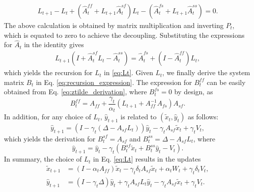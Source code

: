 \begin{align*}
    L_{t+1} - L_t
    + (\hat{A}_t^{ff} + L_{t+1} \hat{A}_t^{sf}) L_t - (\hat{A}_t^{fs} + L_{t+1} \hat{A}_t^{ss}) = 0 
    .
\end{align*}
The above calculation is obtained by matrix multiplication and inverting $P_t$, which is equated to zero to achieve the decoupling. 
Substituting the expressions for $\hat{A}_t$ in the identity gives
\begin{align*}
    L_{t+1} (I + \hat{A}_t^{sf} L_t - \hat{A}_t^{ss}) = \hat{A}_t^{fs} + (I - \hat{A}_t^{ff}) L_t,
\end{align*}
which yields the recursion for $L_t$ in \eqref{eq:Lt}. Given $L_{t}$, we finally derive the system matrix $B_t$ in Eq. \eqref{eq:recursion_expression}.
The expression for $B_t^{ff}$ can be easily obtained from Eq. \eqref{eq:ztilde_derivation}, where $B_t^{fs} = 0 $ by design, as
\begin{equation*}
    B_t^{ff} = A_{ff} + \frac{\gamma_t}{\alpha_t} (L_{t+1} + A_{ff}^{-1} A_{fs}) A_{sf} .
\end{equation*}
In addition, for any choice of $L_t$, $\hat{y}_{t+1}$ is related to $(\tilde{x}_t, \hat{y}_t)$ as follows:
\begin{equation*}
    \hat{y}_{t+1} = (I - \gamma_t (\Delta - A_{sf} L_t)) \hat{y}_t - \gamma_t A_{sf} \tilde{x}_t + \gamma_t V_t,
\end{equation*}
which yields the derivation for $B_t^{sf} = A_{sf}$ and $B_t^{ss} = \Delta - A_{sf} L_t$, where
\begin{equation}\label{eq:slow_derivation}
    \hat{y}_{t+1} = \hat{y}_t - \gamma_t (B_t^{sf} \tilde{x}_t + B_t^{ss} \hat{y}_t - V_t ) .
\end{equation}
In summary, the choice of $L_t$ in Eq. \eqref{eq:Lt} results in the updates
\begin{equation}\label{eq:fast_slow_updates}
    \begin{split}
    \tilde{x}_{t+1} &= (I - \alpha_t A_{ff}) \tilde{x}_t - \gamma_t \delta_t A_{sf} \tilde{x}_t + \alpha_t W_t + \gamma_t \delta_t V_t, 
    \\ 
    \hat{y}_{t+1} &= (I - \gamma_t \Delta) \hat{y}_t + \gamma_t A_{sf} L_t \hat{y}_t - \gamma_t A_{sf} \tilde{x}_t + \gamma_t V_t.     
    \end{split}
\end{equation}
